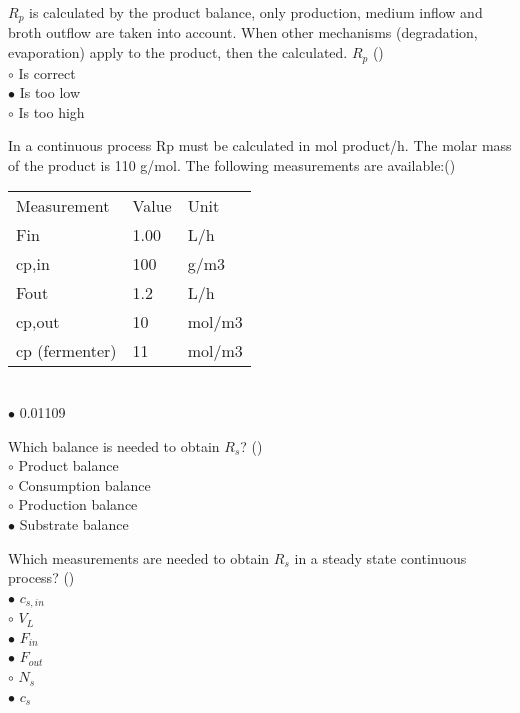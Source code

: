 \documentclass[]{beamer}
\begin{document}
\begin{frame}[shrink] {}
\addtocounter{answers}{1}
\color{blue}
$R_p$ is calculated by the product balance, only production, medium inflow and broth outflow are taken into account.
When other mechanisms (degradation, evaporation) apply to the product, then the calculated. $R_p$ ()\\
\color{black}
\setlength{\parindent}{-0.4cm}
{\color{red}$\circ$} Is correct\\
{\color{red}$\bullet$} Is too low \\
{\color{red}$\circ$} Is too high \\
\end{frame}

\begin{frame}[shrink] {}
\addtocounter{answers}{1}
\color{blue}
In a continuous process Rp must be calculated in mol product/h. The molar mass of the product is 110 g/mol. The following measurements are available:({})\\[0.3em]
\color{gray}
\begin{tabular}[]{l l l}
Measurement & Value & Unit\\
Fin & 1.00 & L/h\\
cp,in& 	100& 	g/m3\\
Fout& 	1.2& 	L/h\\
cp,out&  	10 & 	mol/m3\\
cp (fermenter) & 11 & 	mol/m3\\
\end{tabular}\\[0.3em]
\color{black}
\setlength{\parindent}{-0.4cm}
{\color{red}$\bullet$} 0.01109
 
\end{frame}

\begin{frame}[shrink] {}
\addtocounter{answers}{1}
\color{blue}
Which balance is needed to obtain $R_s$? ()\\[0.3em]
\color{black}
\setlength{\parindent}{-0.4cm}
{\color{red}$\circ$}  Product balance  \\
{\color{red}$\circ$} Consumption balance\\
{\color{red}$\circ$} Production balance \\
{\color{red}$\bullet$} Substrate balance 
\end{frame}

\begin{frame}[shrink] {}
\addtocounter{answers}{1}
\color{blue}
Which measurements are needed to obtain $R_s$ in a steady state continuous process?  ()\\
\color{black}
\setlength{\parindent}{-0.4cm}
{\color{red}$\bullet$}  $c_{s,in}$\\
{\color{red}$\circ$} $V_L$\\
{\color{red}$\bullet$} $F_{in}$\\
{\color{red}$\bullet$} $F_{out}$\\
{\color{red}$\circ$} $N_s$\\
{\color{red}$\bullet$} $c_s$
\end{frame}
\end{document}
